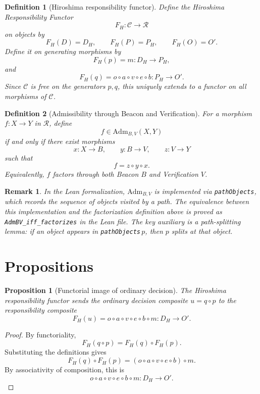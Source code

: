 \documentclass[11pt]{article}
\newtheorem{definition}{Definition}
\newtheorem{proposition}{Proposition}
\newtheorem{remark}{Remark}
\begin{document}
\begin{definition}[Hiroshima responsibility functor]
Define the Hiroshima Responsibility Functor
\[
  F_H:\mathcal{C}\to\mathcal{R}
\]
on objects by
\[
  F_H(D)=D_H,\qquad F_H(P)=P_H,\qquad F_H(O)=O'.
\]
Define it on generating morphisms by
\[
  F_H(p)=m:D_H\to P_H,
\]
and
\[
  F_H(q)=o\circ a\circ v\circ e\circ b:P_H\to O'.
\]
Since $\mathcal{C}$ is free on the generators $p,q$, this uniquely extends to
a functor on all morphisms of $\mathcal{C}$.
\end{definition}

\begin{definition}[Admissibility through Beacon and Verification]
For a morphism $f:X\to Y$ in $\mathcal{R}$, define
\[
  f\in \mathrm{Adm}_{B,V}(X,Y)
\]
if and only if there exist morphisms
\[
  x:X\to B,\qquad y:B\to V,\qquad z:V\to Y
\]
such that
\[
  f=z\circ y\circ x.
\]
Equivalently, $f$ factors through both Beacon $B$ and Verification $V$.
\end{definition}

\begin{remark}
In the Lean formalization, $\mathrm{Adm}_{B,V}$ is implemented via
\texttt{pathObjects}, which records the sequence of objects visited by a path.
The equivalence between this implementation and the factorization definition
above is proved as \texttt{AdmBV\_iff\_factorizes} in the Lean file.  The key
auxiliary is a path-splitting lemma: if an object appears in
\texttt{pathObjects}$\,p$, then $p$ splits at that object.
\end{remark}

\section*{Propositions}

\begin{proposition}[Functorial image of ordinary decision]
The Hiroshima responsibility functor sends the ordinary decision composite
$u=q\circ p$ to the responsibility composite
\[
  F_H(u)
  =
  o\circ a\circ v\circ e\circ b\circ m
  :
  D_H\to O'.
\]
\end{proposition}

\begin{proof}
By functoriality,
\[
  F_H(q\circ p)=F_H(q)\circ F_H(p).
\]
Substituting the definitions gives
\[
  F_H(q)\circ F_H(p)
  =
  (o\circ a\circ v\circ e\circ b)\circ m.
\]
By associativity of composition, this is
\[
  o\circ a\circ v\circ e\circ b\circ m:D_H\to O'.
\]
\end{proof}
\end{document}
